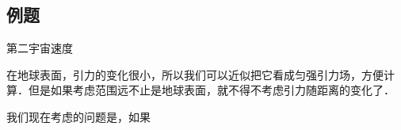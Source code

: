 \subsection{例题}

\begin{example}{第二宇宙速度}

在地球表面，引力的变化很小，所以我们可以近似把它看成匀强引力场，方便计算．但是如果考虑范围远不止是地球表面，就不得不考虑引力随距离的变化了．

我们现在考虑的问题是，如果




\end{example}
















